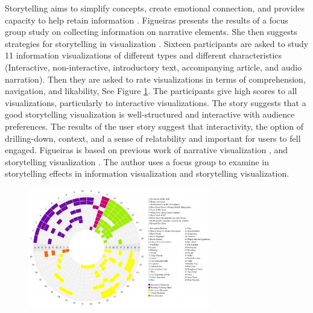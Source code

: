 \documentclass{egpubl}
\begin{document}
Storytelling aims to simplify concepts, create emotional connection, and provides capacity to help retain information \cite{figueiras2014tell}.
Figueiras presents the results of a focus group study on collecting information on narrative elements. She then suggests strategies for storytelling in visualization \cite{figueiras2014tell}.
Sixteen participants are asked to study 11 information visualizations of different types and different characteristics (Interactive, non-interactive, introductory text, accompanying article, and audio narration). Then they are asked to rate visualizations in terms of  comprehension, navigation, and likability, See Figure \ref{fig:fig2014}.
The participants give high scores to all visualizations, particularly to interactive visualizations. The story suggests that a good storytelling visualization is well-structured and interactive with audience preferences. The results of the user story suggest that interactivity, the option of drilling-down, context, and a sense of relatability and important for users to fell engaged.
Figueiras is based on previous work of narrative visualization \cite{segal}, and storytelling visualization \cite{Kosara,sci}. The author uses a focus group to examine in storytelling effects in information visualization and storytelling visualization.
\begin{figure}
\begingroup
\centering
\includegraphics[width=8cm]{./images/fig2014}
\label{fig:fig2014}
\endgroup
\end{figure}
\end{document}
